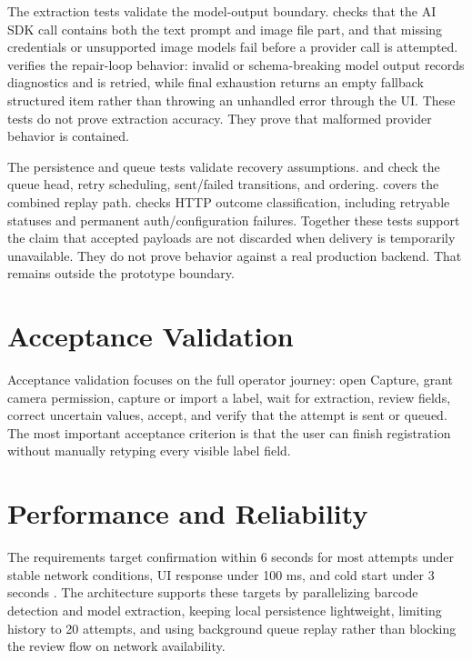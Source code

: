 The extraction tests validate the model-output boundary.  checks that the AI SDK call contains both the text prompt and image file part, and that missing credentials or unsupported image models fail before a provider call is attempted.  verifies the repair-loop behavior: invalid or schema-breaking model output records diagnostics and is retried, while final exhaustion returns an empty fallback structured item rather than throwing an unhandled error through the UI. These tests do not prove extraction accuracy. They prove that malformed provider behavior is contained.

The persistence and queue tests validate recovery assumptions.  and  check the queue head, retry scheduling, sent/failed transitions, and ordering.  covers the combined replay path.  checks HTTP outcome classification, including retryable statuses and permanent auth/configuration failures. Together these tests support the claim that accepted payloads are not discarded when delivery is temporarily unavailable. They do not prove behavior against a real production backend. That remains outside the prototype boundary.

\section{Acceptance Validation}

Acceptance validation focuses on the full operator journey: open Capture, grant camera permission, capture or import a label, wait for extraction, review fields, correct uncertain values, accept, and verify that the attempt is sent or queued. The most important acceptance criterion is that the user can finish registration without manually retyping every visible label field.

\section{Performance and Reliability}

The requirements target confirmation within 6 seconds for most attempts under stable network conditions, UI response under 100 ms, and cold start under 3 seconds \cite{requirements-register}. The architecture supports these targets by parallelizing barcode detection and model extraction, keeping local persistence lightweight, limiting history to 20 attempts, and using background queue replay rather than blocking the review flow on network availability.

